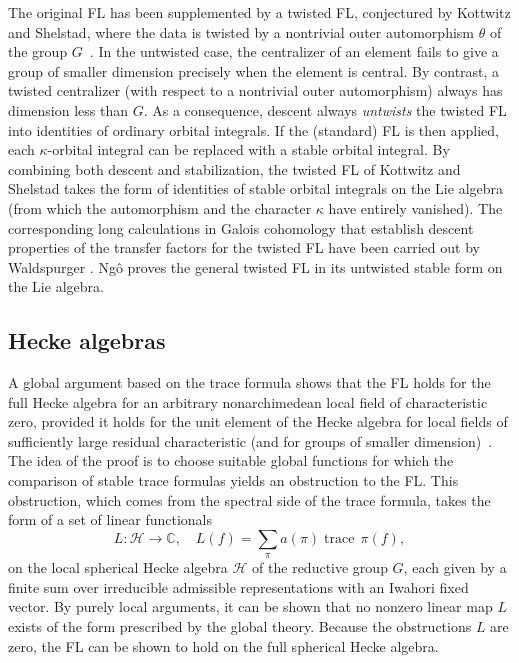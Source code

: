 \documentclass[brochure,english,12pt]{bourbaki}
\def\op#1{{\operatorname{#1}}}
\newcommand{\ring}[1]{\mathbb{#1}}
\begin{document}
The original FL has been supplemented by a twisted
FL, conjectured by Kottwitz and Shelstad, where the
data is twisted by a nontrivial outer automorphism $\theta$ of the
group $G$~\cite{KS:1999}.  In the untwisted case, the centralizer of an element fails
to give a group of smaller dimension precisely when the element is
central.  By contrast, a twisted centralizer (with respect to a
nontrivial outer automorphism) always has dimension less than $G$.  As
a consequence, descent always {\it untwists} the twisted FL
 into identities of ordinary orbital integrals.  If the
(standard) FL is then applied, each $\kappa$-orbital
integral can be replaced with a stable orbital integral.  By combining both
descent and stabilization, the twisted FL of Kottwitz and Shelstad
takes the form of identities of stable orbital integrals on the Lie
algebra (from which the automorphism and the character $\kappa$ have
entirely vanished).  The corresponding long calculations in Galois
cohomology that establish descent properties of the transfer factors
for the twisted FL have been carried out by
Waldspurger \cite{Wald:2008}.  Ng\^o proves the general twisted FL in
its untwisted stable form on the Lie algebra.



\subsection{Hecke algebras}

 A global argument based on
the trace formula shows that the FL holds for the full
Hecke algebra for an arbitrary nonarchimedean local field of
characteristic zero, provided it holds for the unit element of the
Hecke algebra for local fields of sufficiently large residual
characteristic (and for groups of smaller dimension)~\cite{FLSE}.  
The idea of the proof is to choose suitable global
functions for which the comparison of stable trace formulas yields an
obstruction to the FL.  This obstruction, which comes from the
spectral side of the trace formula, takes the form
of a set of linear functionals  
\[
L:{\mathcal H}\to\ring{C},\quad L(f) = \sum_\pi a(\pi) \op{trace}\,\pi(f),
\]
on the local spherical Hecke
algebra ${\mathcal H}$ of the reductive group $G$, each given by a finite sum over
irreducible admissible representations with an Iwahori fixed vector.
By purely local arguments, it
can be shown that no nonzero linear map $L$ exists of the form
prescribed by the global theory.  
Because the obstructions $L$ are zero,
the FL can be shown to hold on the full spherical Hecke algebra.
\end{document}
